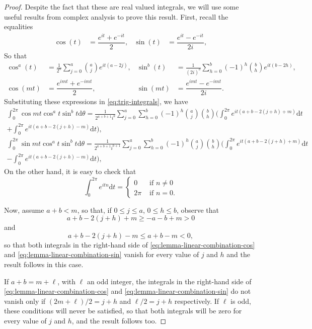 \documentclass[a4paper]{article}
\theoremstyle{plain}
\theoremstyle{definition}
\newcommand{\dr}{\mathrm{d}}
\begin{document}
    \begin{proof}
        Despite the fact that these are real valued integrals, we will use some useful results from complex analysis to prove this result. First, recall the equalities
        \begin{align}
            \cos(t) &= \dfrac{e^{it}+e^{-it}}{2}, &
            \sin(t) &= \dfrac{e^{it}-e^{-it}}{2 i}, 
        \end{align}
        So that 
        \begin{align*}
            \cos^a(t) &= \frac 1 {2^a}\sum_{j=0}^a\binom a j e^{it(a-2j)},&
            \sin^b(t) &= \frac 1 {(2i)^b}\sum_{h=0}^b (-1)^h\binom b h e^{it(b-2h)},\\
            \cos(mt) &= \dfrac{e^{imt}+e^{-imt}}{2},&
            \sin(mt) &= \dfrac{e^{imt}-e^{-imt}}{2 i}.
        \end{align*}
        Substituting these expressions in \eqref{eq:trig-integrals}, we have
        \begin{multline}
        \label{eq:lemma-linear-combination-cos}
        \int_0^{2\pi}\cos mt \cos^a t \sin^b t \dr\theta=\frac 1 {2^{a+b+1}i^b}\sum_{j=0}^a\sum_{h=0}^b(-1)^h\binom{a}{j}\binom{b}{h}\Big(\int_0^{2\pi}e^{it(a+b-2(j+h)+m)}\dr t\\+\int_0^{2\pi}e^{it(a+b-2(j+h)-m)}\dr t\Big),
        \end{multline}
        \begin{multline}
        \label{eq:lemma-linear-combination-sin}
        \int_0^{2\pi}\sin mt \cos^a t \sin^b t \dr\theta=\frac 1 {2^{a+b+1}i^{b+1}}\sum_{j=0}^a\sum_{h=0}^b(-1)^h\binom{a}{j}\binom{b}{h}\Big(\int_0^{2\pi}e^{it(a+b-2(j+h)+m)}\dr t\\-\int_0^{2\pi}e^{it(a+b-2(j+h)-m)}\dr t\Big),
        \end{multline}
        On the other hand, it is easy to check that
        \begin{equation*}
            \int_0^{2\pi}e^{itn}\dr t =\begin{cases}
                0 & \text{ if } n\neq0\\
                2 \pi & \text{ if }n=0.
            \end{cases}
        \end{equation*}
        
        Now, assume $a+b<m$, so that, if $0\leq j\leq a$, $0\leq h\leq b$, observe that
        $$
        a+b-2(j+h)+m\geq -a-b+m>0
        $$
        and
        $$
        a+b-2(j+h)-m\leq a+b-m<0,
        $$
        so that both integrals in the right-hand side of \eqref{eq:lemma-linear-combination-cos} and \eqref{eq:lemma-linear-combination-sin} vanish for every value of $j$ and $h$ and the result follows in this case.

        If $a+b=m+\ell$, with $\ell$ an odd integer, the integrals in the right-hand side of \eqref{eq:lemma-linear-combination-cos} and \eqref{eq:lemma-linear-combination-sin} do not vanish only if $(2m+\ell)/2= j+h$ and $\ell/2= j+h$ respectively. If $\ell$ is odd, these conditions will never be satisfied, so that both integrals will be zero for every value of $j$ and $h$, and the result follows too.  
    \end{proof}
    
\end{document}
